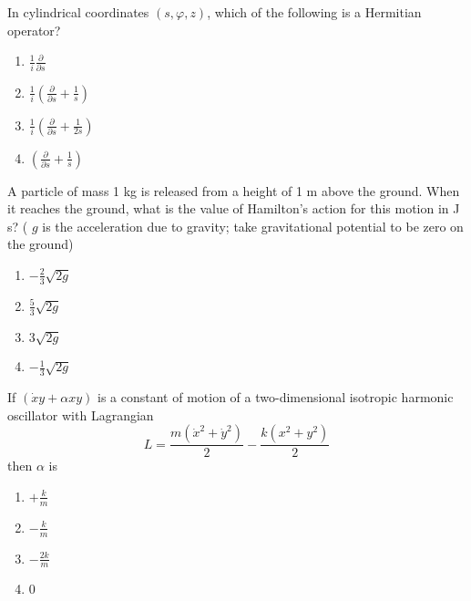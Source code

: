 \iffalse
\chapter{2022}
\author{AI24BTECH11012}
\section{ph}
\fi
    \item In cylindrical coordinates $(s, \varphi, z)$, which of the following is a Hermitian operator?
    \begin{enumerate}
        \item $\frac{1}{i} \frac{\partial}{\partial s}$
        \item $\frac{1}{i} \left( \frac{\partial}{\partial s} + \frac{1}{s} \right)$
        \item $\frac{1}{i} \left( \frac{\partial}{\partial s} + \frac{1}{2s} \right)$
        \item $\left( \frac{\partial}{\partial s} + \frac{1}{s} \right)$
    \end{enumerate}

    \item A particle of mass 1 kg is released from a height of 1 m above the ground. When it reaches the ground, what is the value of Hamilton's action for this motion in J s? ( $g$ is the acceleration due to gravity; take gravitational potential to be zero on the ground)
    \begin{enumerate}
        \item $-\frac{2}{3} \sqrt{2g}$
        \item $\frac{5}{3} \sqrt{2g}$
        \item $3 \sqrt{2g}$
        \item $-\frac{1}{3} \sqrt{2g}$
    \end{enumerate}
    
    \item If $(\dot{x} y + \alpha xy)$ is a constant of motion of a two-dimensional isotropic harmonic oscillator with Lagrangian
    \[
    L = \frac{m(\dot{x}^2 + \dot{y}^2)}{2} - \frac{k(x^2 + y^2)}{2}
    \]
    then $\alpha$ is
    \begin{enumerate}
        \item $+\frac{k}{m}$
        \item $-\frac{k}{m}$
        \item $-\frac{2k}{m}$
        \item 0
    \end{enumerate}

